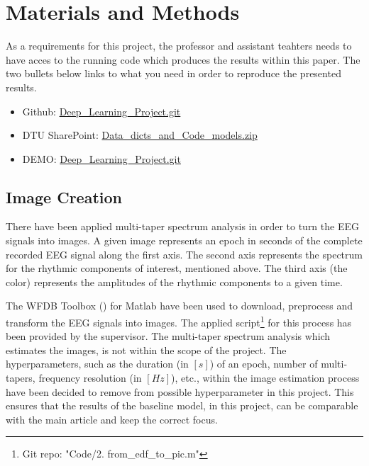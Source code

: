 \section{Materials and Methods}
\label{sec:materials_and_methods}

 As a requirements for this project, the professor and assistant teahters needs to have acces to the running code which produces the results within this paper. The two bullets below links to what you need in order to reproduce the presented results.
 \begin{itemize}
 	\item Github: \href{https://github.com/anderslaunerbaek/Deep\_Learning\_Project.git}{Deep\_Learning\_Project.git}
 	\item DTU SharePoint: \href{https://dtudk-my.sharepoint.com/personal/s160159\_win\_dtu\_dk/\_layouts/15/guestaccess.aspx?docid=093aa4dcaee0b4e3aa18b0ee67061a678&authkey=AbdnyuYwQUWn0BDEPeDn1Mg&e=b79a063cd72d43a9b7db88f8b8fd1b06}{Data\_dicts\_and\_Code\_models.zip}
 	\item DEMO: \href{https://github.com/anderslaunerbaek/Deep\_Learning\_Project.git}{Deep\_Learning\_Project.git}
 \end{itemize}

\subsection{Image Creation}
There have been applied multi-taper spectrum analysis in order to turn the EEG signals into images. A given image represents an epoch in seconds of the complete recorded EEG signal along the first axis. The second axis represents the spectrum for the rhythmic components of interest, mentioned above. The third axis (the color) represents the amplitudes of the rhythmic components to a given time. 

The WFDB Toolbox (\cite{matlab}) for Matlab have been used to download, preprocess and transform the EEG signals into images. The applied script\footnote{Git repo: "Code/2. from\_edf\_to\_pic.m"} for this process has been provided by the supervisor. 
The multi-taper spectrum analysis which estimates the images, is not within the scope of the project. The hyperparameters, such as the duration (in $\left[s \right]$) of an epoch, number of multi-tapers, frequency resolution (in $\left[Hz \right]$), etc., within the image estimation process have been decided to remove from possible hyperparameter in this project. This ensures that the results of the baseline model, in this project, can be comparable with the main article \cite{main_ar} and keep the correct focus. 

